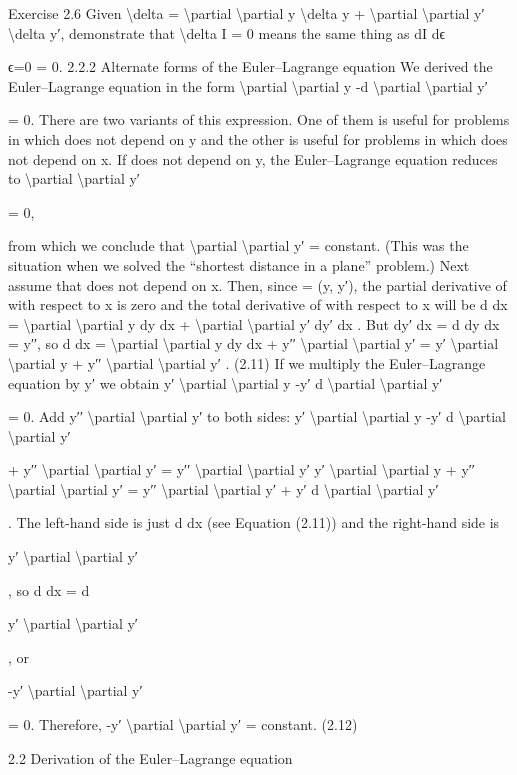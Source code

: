 \begin{exercise}
Exercise 2.6 Given
\textbackslash{}delta  = \textbackslash{}partial
\textbackslash{}partial y \textbackslash{}delta y + \textbackslash{}partial
\textbackslash{}partial y′ \textbackslash{}delta y′,
demonstrate that \textbackslash{}delta I = 0 means the same thing as
dI
dϵ

ϵ=0 = 0.
2.2.2 Alternate forms of the Euler--Lagrange equation
We derived the Euler--Lagrange equation in the form
\textbackslash{}partial
\textbackslash{}partial y -d
\textbackslash{}partial
\textbackslash{}partial y′

= 0.
There are two variants of this expression. One of them is useful for problems
in which  does not depend on y and the other is useful for problems in which
does not depend on x.
If  does not depend on y, the Euler--Lagrange equation reduces to
\textbackslash{}partial
\textbackslash{}partial y′

= 0,

from which we conclude that
\textbackslash{}partial
\textbackslash{}partial y′ = constant.
(This was the situation when we solved the ``shortest distance in a plane''
problem.)
Next assume that  does not depend on x. Then, since  = (y, y′), the
partial derivative of  with respect to x is zero and the total derivative of
with respect to x will be
d
dx = \textbackslash{}partial
\textbackslash{}partial y
dy
dx + \textbackslash{}partial
\textbackslash{}partial y′
dy′
dx .
But dy′
dx = d
dy
dx = y′′, so
d
dx = \textbackslash{}partial
\textbackslash{}partial y
dy
dx + y′′ \textbackslash{}partial
\textbackslash{}partial y′ = y′ \textbackslash{}partial
\textbackslash{}partial y + y′′ \textbackslash{}partial
\textbackslash{}partial y′ .
(2.11)
If we multiply the Euler--Lagrange equation by y′ we obtain
y′ \textbackslash{}partial
\textbackslash{}partial y -y′ d
\textbackslash{}partial
\textbackslash{}partial y′

= 0.
Add y′′ \textbackslash{}partial
\textbackslash{}partial y′ to both sides:
y′ \textbackslash{}partial
\textbackslash{}partial y -y′ d
\textbackslash{}partial
\textbackslash{}partial y′

+ y′′ \textbackslash{}partial
\textbackslash{}partial y′ = y′′ \textbackslash{}partial
\textbackslash{}partial y′
y′ \textbackslash{}partial
\textbackslash{}partial y + y′′ \textbackslash{}partial
\textbackslash{}partial y′ = y′′ \textbackslash{}partial
\textbackslash{}partial y′ + y′ d
\textbackslash{}partial
\textbackslash{}partial y′

.
The left-hand side is just d
dx (see Equation (2.11)) and the right-hand side is

y′ \textbackslash{}partial
\textbackslash{}partial y′

, so
d
dx = d

y′ \textbackslash{}partial
\textbackslash{}partial y′

,
or

-y′ \textbackslash{}partial
\textbackslash{}partial y′

= 0.
Therefore,
-y′ \textbackslash{}partial
\textbackslash{}partial y′ = constant.
(2.12)

2.2
Derivation of the Euler--Lagrange equation
\end{exercise}

